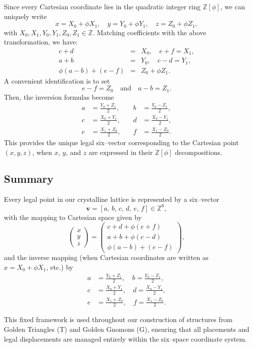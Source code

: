 \documentclass{article}
\begin{document}
Since every Cartesian coordinate lies in the quadratic integer ring \(\mathbb{Z}[\phi]\), we can uniquely write
\[
x = X_0 + \phi X_1,\quad y = Y_0 + \phi Y_1,\quad z = Z_0 + \phi Z_1,
\]
with \(X_0,X_1,Y_0,Y_1,Z_0,Z_1 \in \mathbb{Z}\). Matching coefficients with the above transformation, we have:
\[
\begin{array}{rcl}
c+d &=& X_0,\quad  e+f = X_1,\\[1mm]
a+b &=& Y_0,\quad  c-d = Y_1,\\[1mm]
\phi(a-b) + (e-f) &=& Z_0 + \phi Z_1.
\end{array}
\]
A convenient identification is to set
\[
e-f = Z_0 \quad \text{and} \quad a-b = Z_1.
\]
Then, the inversion formulas become
\[
\begin{aligned}
a &= \frac{Y_0 + Z_1}{2}, \quad &b &= \frac{Y_0 - Z_1}{2},\\[1mm]
c &= \frac{X_0 + Y_1}{2}, \quad &d &= \frac{X_0 - Y_1}{2},\\[1mm]
e &= \frac{X_1 + Z_0}{2}, \quad &f &= \frac{X_1 - Z_0}{2}.
\end{aligned}
\]
This provides the unique legal six–vector corresponding to the Cartesian point \((x,y,z)\), when \(x\), \(y\), and \(z\) are expressed in their \(\mathbb{Z}[\phi]\) decompositions.

\subsection*{Summary}

Every legal point in our crystalline lattice is represented by a six–vector 
\[
\mathbf{v} = [a,\, b,\, c,\, d,\, e,\, f] \in \mathbb{Z}^6,
\]
with the mapping to Cartesian space given by
\[
\begin{pmatrix} x \\ y \\ z \end{pmatrix}
=
\begin{pmatrix}
c+d+\phi(e+f)\\[1mm]
a+b+\phi(c-d)\\[1mm]
\phi(a-b)+(e-f)
\end{pmatrix},
\]
and the inverse mapping (when Cartesian coordinates are written as \(x=X_0+\phi X_1\), etc.) by
\[
\begin{aligned}
a &= \frac{Y_0 + Z_1}{2}, \quad b = \frac{Y_0 - Z_1}{2},\\[1mm]
c &= \frac{X_0 + Y_1}{2}, \quad d = \frac{X_0 - Y_1}{2},\\[1mm]
e &= \frac{X_1 + Z_0}{2}, \quad f = \frac{X_1 - Z_0}{2}.
\end{aligned}
\]

This fixed framework is used throughout our construction of structures from Golden Triangles (T) and Golden Gnomons (G), ensuring that all placements and legal displacements are managed entirely within the six–space coordinate system.
\end{document}
